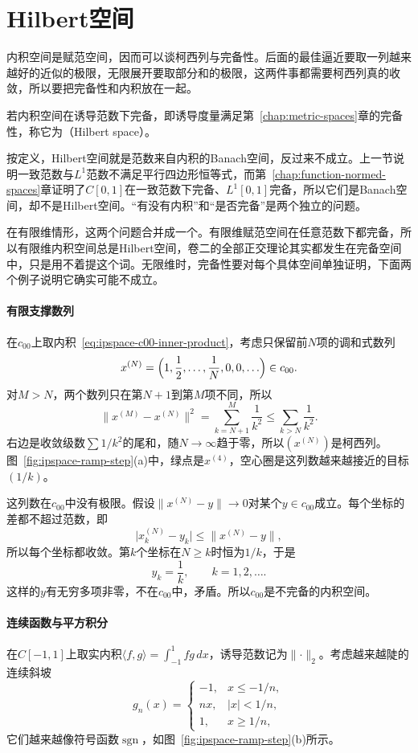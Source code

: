 \section{Hilbert空间}
\label{sec:ipspace-hilbert-spaces}

内积空间是赋范空间，因而可以谈柯西列与完备性。后面的最佳逼近要取一列越来越好的近似的极限，无限展开要取部分和的极限，这两件事都需要柯西列真的收敛，所以要把完备性和内积放在一起。

\begin{definition}[Hilbert空间]
\label{def:ipspace-hilbert}
若内积空间在诱导范数下完备，即诱导度量满足第~\ref{chap:metric-spaces}章的完备性，称它为（Hilbert space）。
\end{definition}

按定义，Hilbert空间就是范数来自内积的Banach空间，反过来不成立。上一节说明一致范数与$L^1$范数不满足平行四边形恒等式，而第~\ref{chap:function-normed-spaces}章证明了$C[0,1]$在一致范数下完备、$L^1[0,1]$完备，所以它们是Banach空间，却不是Hilbert空间。“有没有内积”和“是否完备”是两个独立的问题。

在有限维情形，这两个问题合并成一个。有限维赋范空间在任意范数下都完备，所以有限维内积空间总是Hilbert空间，卷二的全部正交理论其实都发生在完备空间中，只是用不着提这个词。无限维时，完备性要对每个具体空间单独证明，下面两个例子说明它确实可能不成立。

\paragraph{有限支撑数列}
在$c_{00}$上取内积~\eqref{eq:ipspace-c00-inner-product}，考虑只保留前$N$项的调和式数列
\[
 x^{(N)}=\Bigl(1,\frac12,\ldots,\frac1N,0,0,\ldots\Bigr)\in c_{00}.
\]
对$M>N$，两个数列只在第$N+1$到第$M$项不同，所以
\[
 \lVert x^{(M)}-x^{(N)}\rVert^2=\sum_{k=N+1}^M\frac1{k^2}\leq\sum_{k>N}\frac1{k^2}.
\]
右边是收敛级数$\sum1/k^2$的尾和，随$N\to\infty$趋于零，所以$(x^{(N)})$是柯西列。图~\ref{fig:ipspace-ramp-step}(a)中，绿点是$x^{(4)}$，空心圈是这列数越来越接近的目标$(1/k)$。

这列数在$c_{00}$中没有极限。假设$\lVert x^{(N)}-y\rVert\to0$对某个$y\in c_{00}$成立。每个坐标的差都不超过范数，即
\[
 \lvert x^{(N)}_k-y_k\rvert\leq\lVert x^{(N)}-y\rVert ,
\]
所以每个坐标都收敛。第$k$个坐标在$N\geq k$时恒为$1/k$，于是
\[
 y_k=\frac1k,\qquad k=1,2,\ldots .
\]
这样的$y$有无穷多项非零，不在$c_{00}$中，矛盾。所以$c_{00}$是不完备的内积空间。

\paragraph{连续函数与平方积分}
在$C[-1,1]$上取实内积$\langle f,g\rangle=\int_{-1}^1fg\,dx$，诱导范数记为$\lVert\cdot\rVert_2$。考虑越来越陡的连续斜坡
\[
 g_n(x)=\begin{cases}-1,&x\leq-1/n,\\ nx,&\lvert x\rvert<1/n,\\ 1,&x\geq1/n,\end{cases}
\]
它们越来越像符号函数$\operatorname{sgn}$，如图~\ref{fig:ipspace-ramp-step}(b)所示。

